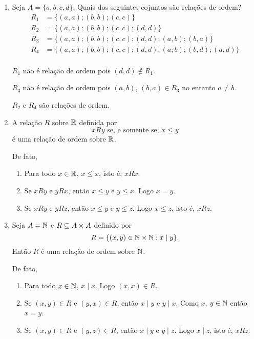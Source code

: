\begin{exemplos}
	\begin{enumerate}
		\item Seja $A = \{a,b,c,d\}$. Quais dos seguintes cojuntos são relações de ordem?
		\begin{align*}
			R_1 &= \{(a,a);(b,b);(c,c)\}\\
			R_2 &= \{(a,a);(b,b);(c,c);(d,d)\}\\
			R_3 &= \{(a,a);(b,b);(c,c);(d,d);(a,b);(b,a)\}\\
			R_4 &= \{(a,a);(b,b);(c,c);(d,d);(a;b);(b,d);(a,d)\}\\
		\end{align*}
		\begin{solucao}
			$R_1$ não é relação de ordem pois $(d,d) \notin R_1$.

			$R_3$ não é relação de ordem pois $(a,b)$, $(b,a) \in R_3$ no entanto $a \ne b$.

			$R_2$ e $R_4$ são relações de ordem.
		\end{solucao}

		\item A relação $R$ sobre $\mathbb{R}$ definida por
		\[
			xRy \mbox{ se, e somente se, } x \leqslant y
		\]
		é uma relação de ordem sobre $\mathbb{R}$.
		\begin{solucao}
			De fato,
			\begin{enumerate}
				\item Para todo $x \in \mathbb{R}$, $x \leqslant x$, isto é, $xRx$.
				\item Se $xRy$ e $yRx$, então $x \leqslant y$ e $y \leqslant x$. Logo $x = y$.
				\item Se $xRy$ e $yRz$, então $x \leqslant y$ e $y \leqslant z$. Logo $x \leqslant z$, isto é, $xRz$.
			\end{enumerate}
		\end{solucao}

		\item Seja $A = \mathbb{N}$ e $R \subseteq A \times A$ definido por
		\[
			R = \{(x,y) \in \mathbb{N} \times \mathbb{N} : x \mid y\}.
		\]
		Então $R$ é uma relação de ordem sobre $\mathbb{N}$.
		\begin{solucao}
			De fato,
			\begin{enumerate}
				\item Para todo $x \in \mathbb{N}$, $x \mid x$. Logo $(x,x) \in R$.
				\item Se $(x,y)\in R$ e $(y,x) \in R$, então $x \mid y$ e $y \mid x$. Como $x$, $y \in \mathbb{N}$ então $x = y$.
				\item Se $(x,y) \in R$ e $(y,z) \in R$, então $x \mid y$ e $y \mid z$. Logo $x \mid z$, isto é, $xRz$.
			\end{enumerate}
		\end{solucao}
	\end{enumerate}
\end{exemplos}

